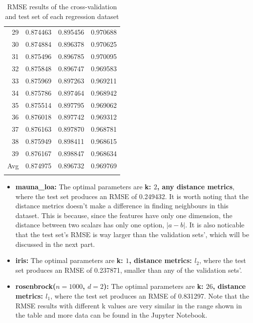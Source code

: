 \documentclass{article} %
\begin{document}
\begin{table}[!ht]
\begin{minipage}{0.33333\textwidth}
{\begin{tabular}[t]{||r | c c c||}
      29  & 0.874463  & 0.895456  & 0.970688 \\
      30  & 0.874884  & 0.896378  & 0.970625 \\
      31  & 0.875496  & 0.896785  & 0.970095 \\
      32  & 0.875848  & 0.896747  & 0.969583 \\
      33  & 0.875969  & 0.897263  & 0.969211 \\
      34  & 0.875786  & 0.897464  & 0.968942 \\
      35  & 0.875514  & 0.897795  & 0.969062 \\
      36  & 0.876018  & 0.897742  & 0.969312 \\
      37  & 0.876163  & 0.897870  & 0.968781 \\
      38  & 0.875949  & 0.898411  & 0.968615 \\
      39  & 0.876167  & 0.898847  & 0.968634 \\
      \hline
      Avg& \cellcolor{cyan} 0.874975 &  0.896732 &  0.969769 \\
      \hline
      \rowcolor{pink}\multicolumn{4}{||c||}{Test Set RMSE: 0.831297}\\
      \hline
  \end{tabular}} %
  \end{minipage}
  \caption{RMSE results of the cross-validation and test set of each regression dataset}
  \end{table}



  \begin{itemize}
    \item \textbf{mauna\_loa:} The optimal parameters are \textbf{k: $2$, any distance metrics}, where the test set produces an RMSE of 0.249432. It is worth noting that the distance metrics doesn't make a difference in finding neighbours in this dataset. This is because, since the features have only one dimension, the distance between two scalars has only one option, $|a-b|$. It is also noticable that the test set's RMSE is way larger than the validation sets', which will be discussed in the next part.
    \item \textbf{iris:} The optimal parameters are \textbf{k: $1$, distance metrics: $l_2$}, where the test set produces an RMSE of 0.237871, smaller than any of the validation sets'.
    \item \textbf{rosenbrock($n=1000$, $d=2$):} The optimal parameters are \textbf{k: $26$, distance metrics: $l_1$}, where the test set produces an RMSE of 0.831297. Note that the RMSE results with different k values are very similar in the range shown in the table and more data can be found in the Jupyter Notebook.
  \end{itemize}
\end{document}
